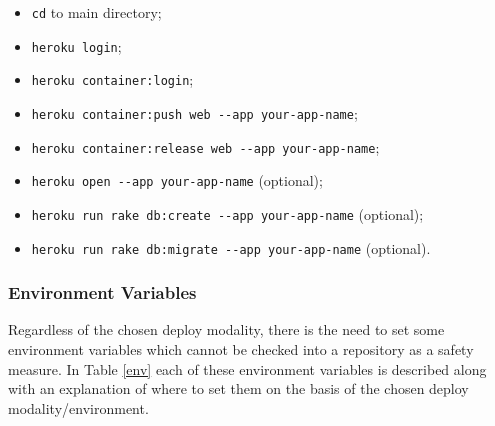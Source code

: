 \documentclass[a4paper, english]{article}
\newcounter{subsubsubsection}[subsubsection]
\begin{document}

\begin{itemize}
\item \verb|cd| to main directory;
\item \verb|heroku login|;
\item \verb|heroku container:login|;
\item \verb|heroku container:push web --app your-app-name|;
\item \verb|heroku container:release web --app your-app-name|;
\item \verb|heroku open --app your-app-name| (optional);
\item \verb|heroku run rake db:create --app your-app-name| (optional);
\item \verb|heroku run rake db:migrate --app your-app-name| (optional).
\end{itemize}

\subsubsection{Environment Variables}

Regardless of the chosen deploy modality, there is the need to set some environment variables which cannot be checked into a repository as a safety measure. In Table \ref{env} each of these environment variables is described along with an explanation of where to set them on the basis of the chosen deploy modality/environment. 
\end{document}
